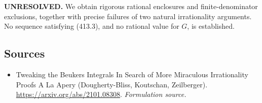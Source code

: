 \documentclass[11pt]{article}
\begin{document}
\textbf{UNRESOLVED.} We obtain rigorous rational enclosures and finite-denominator exclusions, together with precise failures of two natural irrationality arguments. No sequence satisfying (413.3), and no rational value for $G$, is established.

\subsection{Sources}
\begin{itemize}
\item[S1]Tweaking the Beukers Integrals In Search of More Miraculous Irrationality Proofs A La Apery (Dougherty-Bliss, Koutschan, Zeilberger).
\url{https://arxiv.org/abs/2101.08308}.
\textit{Formulation source.}
\end{itemize}
\end{document}
